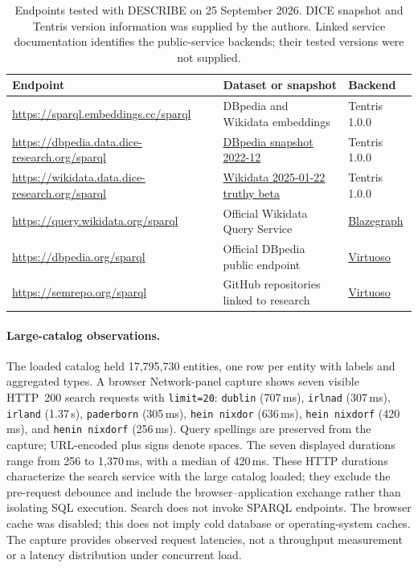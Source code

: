 \begin{table}[t]
\centering
\caption{Endpoints tested with DESCRIBE on 25 September 2026. DICE snapshot and Tentris version information was supplied by the authors. Linked service documentation identifies the public-service backends; their tested versions were not supplied.}
\label{tab:endpoints}
\begin{tabular}{@{}p{}p{}p{}@{}}
\toprule
Endpoint & Dataset or snapshot & Backend \\
\midrule
\url{https://sparql.embeddings.cc/sparql} & DBpedia and Wikidata embeddings & Tentris 1.0.0 \\
\url{https://dbpedia.data.dice-research.org/sparql} & \href{https://databus.dbpedia.org/dbpedia/collections/dbpedia-snapshot-2022-12}{DBpedia snapshot 2022-12} & Tentris 1.0.0 \\
\url{https://wikidata.data.dice-research.org/sparql} & \href{https://dumps.wikimedia.org/wikidatawiki/entities/20250122}{Wikidata 2025-01-22 truthy beta} & Tentris 1.0.0 \\
\url{https://query.wikidata.org/sparql} & Official Wikidata Query Service & \href{https://wikitech.wikimedia.org/wiki/Wikidata_query_service/Runbook}{Blazegraph} \\
\url{https://dbpedia.org/sparql} & Official DBpedia public endpoint & \href{https://www.dbpedia.org/resources/sparql/}{Virtuoso} \\
\url{https://semrepo.org/sparql} & GitHub repositories linked to research & \href{https://semrepo.org/sparql}{Virtuoso} \\
\bottomrule
\end{tabular}
\end{table}

\paragraph{Large-catalog observations.}
The loaded catalog held 17,795,730 entities, one row per entity with labels and aggregated types. A browser Network-panel capture shows seven visible HTTP~200 search requests with \texttt{limit=20}: \texttt{dublin} (707\,ms), \texttt{irlnad} (307\,ms), \texttt{irland} (1.37\,s), \texttt{paderborn} (305\,ms), \texttt{hein nixdor} (636\,ms), \texttt{hein nixdorf} (420\,ms), and \texttt{henin nixdorf} (256\,ms). Query spellings are preserved from the capture; URL-encoded plus signs denote spaces. The seven displayed durations range from 256 to 1,370\,ms, with a median of 420\,ms. These HTTP durations characterize the search service with the large catalog loaded; they exclude the pre-request debounce and include the browser--application exchange rather than isolating SQL execution. Search does not invoke SPARQL endpoints. The browser cache was disabled; this does not imply cold database or operating-system caches. The capture provides observed request latencies, not a throughput measurement or a latency distribution under concurrent load.

